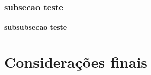 \documentclass[
	12pt,				%
	openright,			%
	twoside,			%
	a4paper,			%
	chapter=TITLE,		%
	sumario=abnt-6027-2012,
	english,			%
	brazil				%
	]{UFVJM-abntex2}
\begin{document}
\subsection{subsecao teste}
\subsubsection{subsubsecao teste}





\chapter*{Considerações finais}











\postextual


\end{document}
